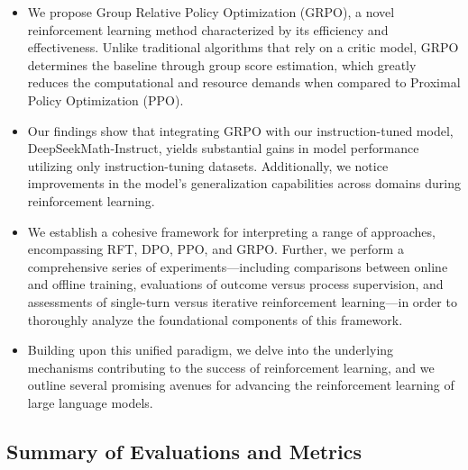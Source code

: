 \begin{itemize}[topsep=0pt]
    \item We propose Group Relative Policy Optimization (GRPO), a novel reinforcement learning method characterized by its efficiency and effectiveness. Unlike traditional algorithms that rely on a critic model, GRPO determines the baseline through group score estimation, which greatly reduces the computational and resource demands when compared to Proximal Policy Optimization (PPO).
    \item Our findings show that integrating GRPO with our instruction-tuned model, DeepSeekMath-Instruct, yields substantial gains in model performance utilizing only instruction-tuning datasets. Additionally, we notice improvements in the model's generalization capabilities across domains during reinforcement learning.
    \item We establish a cohesive framework for interpreting a range of approaches, encompassing RFT, DPO, PPO, and GRPO. Further, we perform a comprehensive series of experiments—including comparisons between online and offline training, evaluations of outcome versus process supervision, and assessments of single-turn versus iterative reinforcement learning—in order to thoroughly analyze the foundational components of this framework.
    \item Building upon this unified paradigm, we delve into the underlying mechanisms contributing to the success of reinforcement learning, and we outline several promising avenues for advancing the reinforcement learning of large language models.
\end{itemize}

\subsection{Summary of Evaluations and Metrics}


